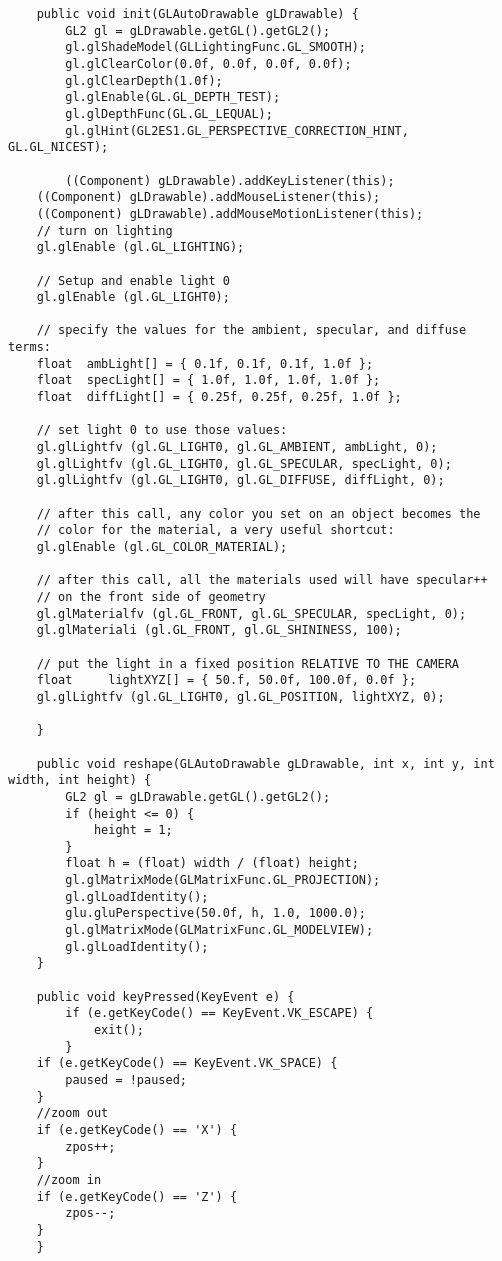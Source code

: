\begin{lstlisting}
    public void init(GLAutoDrawable gLDrawable) {
        GL2 gl = gLDrawable.getGL().getGL2();
        gl.glShadeModel(GLLightingFunc.GL_SMOOTH);
        gl.glClearColor(0.0f, 0.0f, 0.0f, 0.0f);
        gl.glClearDepth(1.0f);
        gl.glEnable(GL.GL_DEPTH_TEST);
        gl.glDepthFunc(GL.GL_LEQUAL);
        gl.glHint(GL2ES1.GL_PERSPECTIVE_CORRECTION_HINT, GL.GL_NICEST);

        ((Component) gLDrawable).addKeyListener(this);
	((Component) gLDrawable).addMouseListener(this);
	((Component) gLDrawable).addMouseMotionListener(this);
	// turn on lighting
	gl.glEnable (gl.GL_LIGHTING);
		
	// Setup and enable light 0
	gl.glEnable (gl.GL_LIGHT0);
		
	// specify the values for the ambient, specular, and diffuse terms:
	float  ambLight[] = { 0.1f, 0.1f, 0.1f, 1.0f };
	float  specLight[] = { 1.0f, 1.0f, 1.0f, 1.0f };
	float  diffLight[] = { 0.25f, 0.25f, 0.25f, 1.0f };
		
	// set light 0 to use those values:
	gl.glLightfv (gl.GL_LIGHT0, gl.GL_AMBIENT, ambLight, 0);
	gl.glLightfv (gl.GL_LIGHT0, gl.GL_SPECULAR, specLight, 0);
	gl.glLightfv (gl.GL_LIGHT0, gl.GL_DIFFUSE, diffLight, 0);
		
	// after this call, any color you set on an object becomes the
	// color for the material, a very useful shortcut:
	gl.glEnable (gl.GL_COLOR_MATERIAL);
		
	// after this call, all the materials used will have specular++
	// on the front side of geometry
	gl.glMaterialfv (gl.GL_FRONT, gl.GL_SPECULAR, specLight, 0);
	gl.glMateriali (gl.GL_FRONT, gl.GL_SHININESS, 100);
		
	// put the light in a fixed position RELATIVE TO THE CAMERA
	float     lightXYZ[] = { 50.f, 50.0f, 100.0f, 0.0f };
	gl.glLightfv (gl.GL_LIGHT0, gl.GL_POSITION, lightXYZ, 0);
		
    }
 
    public void reshape(GLAutoDrawable gLDrawable, int x, int y, int width, int height) {
        GL2 gl = gLDrawable.getGL().getGL2();
        if (height <= 0) {
            height = 1;
        }
        float h = (float) width / (float) height;
        gl.glMatrixMode(GLMatrixFunc.GL_PROJECTION);
        gl.glLoadIdentity();
        glu.gluPerspective(50.0f, h, 1.0, 1000.0);
        gl.glMatrixMode(GLMatrixFunc.GL_MODELVIEW);
        gl.glLoadIdentity();
    }
 
    public void keyPressed(KeyEvent e) {
        if (e.getKeyCode() == KeyEvent.VK_ESCAPE) {
            exit();
        }
	if (e.getKeyCode() == KeyEvent.VK_SPACE) {
	    paused = !paused;
	}
	//zoom out
	if (e.getKeyCode() == 'X') {
	    zpos++;
	}
	//zoom in
	if (e.getKeyCode() == 'Z') {
	    zpos--;
	}
    }
 

\end{lstlisting}
